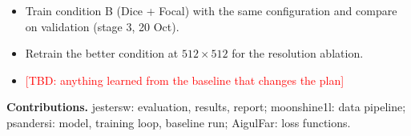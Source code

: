 \documentclass[11pt,a4paper]{article}
\newcommand{\tbd}[1]{\textcolor{red}{[TBD: #1]}}
\newcommand{\teamcontacts}{}
\begin{document}
\begin{itemize}
  \item Train condition B (Dice + Focal) with the same configuration and compare on validation (stage 3, 20 Oct).
  \item Retrain the better condition at $512\times512$ for the resolution ablation.
  \item \tbd{anything learned from the baseline that changes the plan}
\end{itemize}

\textbf{Contributions.} jestersw: evaluation, results, report; moonshine1l: data pipeline; psandersi: model, training loop, baseline run; AigulFar: loss functions.

\teamcontacts
\end{document}

